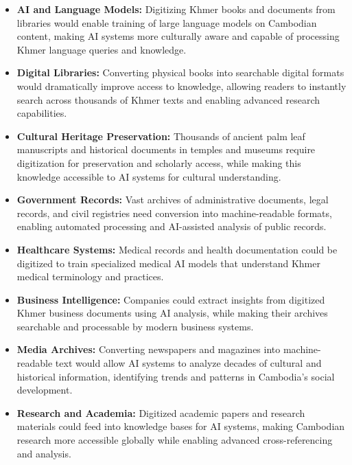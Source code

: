 \begin{itemize}
    \item \textbf{AI and Language Models:} Digitizing Khmer books and documents from libraries would enable training of large language models on Cambodian content, making AI systems more culturally aware and capable of processing Khmer language queries and knowledge.
    
    \item \textbf{Digital Libraries:} Converting physical books into searchable digital formats would dramatically improve access to knowledge, allowing readers to instantly search across thousands of Khmer texts and enabling advanced research capabilities.
    
    \item \textbf{Cultural Heritage Preservation:} Thousands of ancient palm leaf manuscripts and historical documents in temples and museums require digitization for preservation and scholarly access, while making this knowledge accessible to AI systems for cultural understanding.
    
    \item \textbf{Government Records:} Vast archives of administrative documents, legal records, and civil registries need conversion into machine-readable formats, enabling automated processing and AI-assisted analysis of public records.
    
    \item \textbf{Healthcare Systems:} Medical records and health documentation could be digitized to train specialized medical AI models that understand Khmer medical terminology and practices.
    
    \item \textbf{Business Intelligence:} Companies could extract insights from digitized Khmer business documents using AI analysis, while making their archives searchable and processable by modern business systems.
    
    \item \textbf{Media Archives:} Converting newspapers and magazines into machine-readable text would allow AI systems to analyze decades of cultural and historical information, identifying trends and patterns in Cambodia's social development.
    
    \item \textbf{Research and Academia:} Digitized academic papers and research materials could feed into knowledge bases for AI systems, making Cambodian research more accessible globally while enabling advanced cross-referencing and analysis.
\end{itemize}

